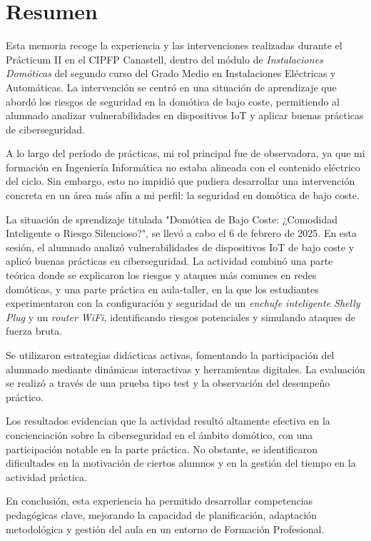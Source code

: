 \chapter{Resumen}

Esta memoria recoge la experiencia y las intervenciones realizadas durante el Prácticum II en el CIPFP Canastell, dentro del módulo de \textit{Instalaciones Domóticas} del segundo curso del Grado Medio en Instalaciones Eléctricas y Automáticas. La intervención se centró en una situación de aprendizaje que abordó los riesgos de seguridad en la domótica de bajo coste, permitiendo al alumnado analizar vulnerabilidades en dispositivos IoT y aplicar buenas prácticas de ciberseguridad.

A lo largo del período de prácticas, mi rol principal fue de observadora, ya que mi formación en Ingeniería Informática no estaba alineada con el contenido eléctrico del ciclo. Sin embargo, esto no impidió que pudiera desarrollar una intervención concreta en un área más afín a mi perfil: la seguridad en domótica de bajo coste. 

La situación de sprendizaje titulada "Domótica de Bajo Coste: ¿Comodidad Inteligente o Riesgo Silencioso?", se llevó a cabo el 6 de febrero de 2025. En esta sesión, el alumnado analizó vulnerabilidades de dispositivos IoT de bajo coste y aplicó buenas prácticas en ciberseguridad. La actividad combinó una parte teórica donde se explicaron los riesgos y ataques más comunes en redes domóticas, y una parte práctica en aula-taller, en la que los estudiantes experimentaron con la configuración y seguridad de un \textit{enchufe inteligente Shelly Plug} y un \textit{router WiFi}, identificando riesgos potenciales y simulando ataques de fuerza bruta.

Se utilizaron estrategias didácticas activas, fomentando la participación del alumnado mediante dinámicas interactivas y herramientas digitales. La evaluación se realizó a través de una prueba tipo test y la observación del desempeño práctico.

Los resultados evidencian que la actividad resultó altamente efectiva en la concienciación sobre la ciberseguridad en el ámbito domótico, con una participación notable en la parte práctica. No obstante, se identificaron dificultades en la motivación de ciertos alumnos y en la gestión del tiempo en la actividad práctica. 

En conclusión, esta experiencia ha permitido desarrollar competencias pedagógicas clave, mejorando la capacidad de planificación, adaptación metodológica y gestión del aula en un entorno de Formación Profesional.

